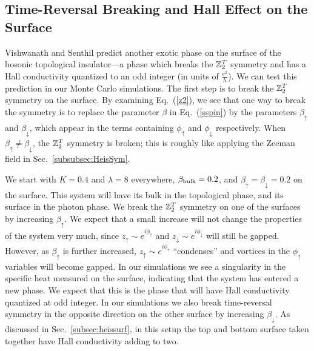\subsection{Time-Reversal Breaking and Hall Effect on the Surface}
\label{cp1Hall}

Vishwanath and Senthil\cite{SenthilVishwanath} predict another exotic phase on the surface of the bosonic topological insulator---a phase which breaks the $\mathbb{Z}_2^T$ symmetry and has a Hall conductivity quantized to an odd integer (in units of $\frac{e^2}{h}$).  We can test this prediction in our Monte Carlo simulations. The first step is to break the $\mathbb{Z}_2^T$ symmetry on the surface. By examining Eq.~(\ref{z2}), we see that one way to break the symmetry is to replace the parameter $\beta$ in Eq.~(\ref{sspin}) by the parameters $\beta_\uparrow$ and $\beta_\downarrow$, which appear in the terms containing $\phi_\uparrow$ and $\phi_\downarrow$ respectively. When $\beta_\uparrow \neq \beta_\downarrow$, the $\mathbb{Z}_2^T$ symmetry is broken; this is roughly like applying the Zeeman field in Sec.~\ref{subsubsec:HeisSym}.

We start with $K=0.4$ and $\lambda=8$ everywhere, $\beta_{\rm bulk}=0.2$, and $\beta_{\uparrow}=\beta_{\downarrow}=0.2$ on the surface. This system will have its bulk in the topological phase, and its surface in the photon phase. We break the $\mathbb{Z}_2^T$ symmetry on one of the surfaces by increasing $\beta_{\uparrow}$. We expect that a small increase will not change the properties of the system very much, since $z_\uparrow\sim e^{i\phi_\uparrow}$ and $z_\downarrow\sim e^{i\phi_\downarrow}$ will still be gapped.\cite{LesikAshvin} However, as $\beta_\uparrow$ is further increased, $z_\uparrow \sim e^{i\phi_\uparrow}$ ``condenses'' and vortices in the $\phi_\uparrow$ variables will become gapped. In our simulations we see a singularity in the specific heat measured on the surface, indicating that the system has entered a new phase. We expect that this is the phase that will have Hall conductivity quantized at odd integer. In our simulations we also break time-reversal symmetry in the opposite direction on the other surface by increasing $\beta_\downarrow$.  As discussed in Sec.~\ref{subsec:heissurf}, in this setup the top and bottom surface taken together have Hall conductivity adding to two.

